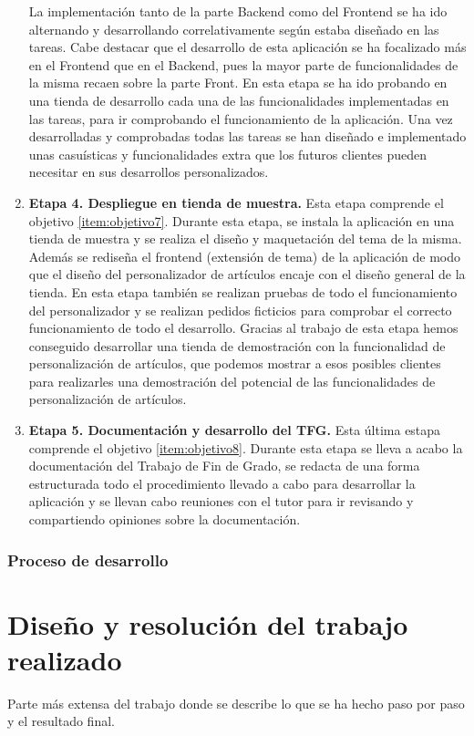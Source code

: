 \documentclass[12pt]{article}
\begin{document}
\begin{enumerate}[label={\textbf{\textbullet}}]
    La implementación tanto de la parte Backend como del Frontend se ha ido alternando y desarrollando correlativamente según estaba diseñado en las tareas. Cabe destacar que el desarrollo de esta aplicación se ha focalizado
    más en el Frontend que en el Backend, pues la mayor parte de funcionalidades de la misma recaen sobre la parte Front. En esta etapa se ha ido probando en una tienda de desarrollo cada una de las funcionalidades implementadas en las tareas, 
    para ir comprobando el funcionamiento de la aplicación. Una vez desarrolladas y comprobadas todas las tareas se han diseñado e implementado unas casuísticas y funcionalidades
    extra que los futuros clientes pueden necesitar en sus desarrollos personalizados.
    \item \textbf{Etapa 4. Despliegue en tienda de muestra.} Esta etapa comprende el objetivo \ref{item:objetivo7}. 
    Durante esta etapa, se instala la aplicación en una tienda de muestra y se realiza el diseño y maquetación del tema de la misma. Además se rediseña el frontend (extensión de tema) de la aplicación de modo que el diseño del personalizador de artículos
    encaje con el diseño general de la tienda. En esta etapa también se realizan pruebas de todo el funcionamiento del personalizador y se realizan pedidos ficticios para comprobar el correcto
    funcionamiento de todo el desarrollo. Gracias al trabajo de esta etapa hemos conseguido desarrollar una tienda de demostración con la funcionalidad de personalización de artículos, que podemos
    mostrar a esos posibles clientes para realizarles una demostración del potencial de las funcionalidades de personalización de artículos.
    \item \textbf{Etapa 5. Documentación y desarrollo del TFG.} Esta última estapa comprende el objetivo \ref{item:objetivo8}. Durante esta etapa
    se lleva a acabo la documentación del Trabajo de Fin de Grado, se redacta de una forma estructurada todo el procedimiento llevado a cabo para desarrollar
    la aplicación y se llevan cabo reuniones con el tutor para ir revisando y compartiendo opiniones sobre la documentación.
\end{enumerate}

\subsubsection{Proceso de desarrollo}


\section{Diseño y resolución del trabajo realizado}
Parte más extensa del trabajo donde se describe lo que se ha hecho paso por paso y el resultado final.
\end{document}
